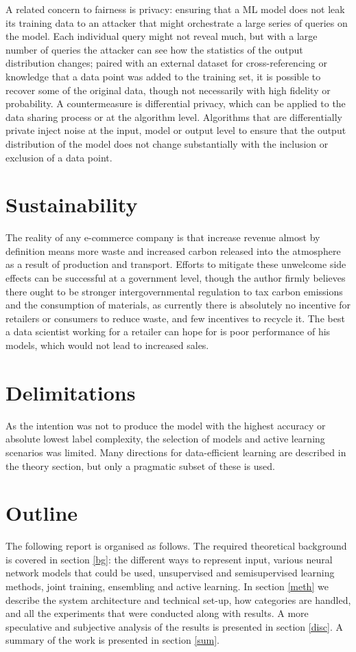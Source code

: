 A related concern to fairness is privacy: ensuring that a ML model does not leak its training data to an attacker that might orchestrate a large series of queries on the model.
Each individual query might not reveal much, but with a large number of queries the attacker can see how the statistics of the output distribution changes; paired with an external dataset for cross-referencing or knowledge that a data point was added to the training set, it is possible to recover some of the original data, though not necessarily with high fidelity or probability.
A countermeasure is differential privacy, which can be applied to the data sharing process or at the algorithm level.
Algorithms that are differentially private inject noise at the input, model or output level to ensure that the output distribution of the model does not change substantially with the inclusion or exclusion of a data point.

\section{Sustainability}

The reality of any e-commerce company is that increase revenue almost by definition means more waste  and increased carbon released into the atmosphere  as a result of production and transport.
Efforts to mitigate these unwelcome side effects can be successful at a government level, though  the author firmly believes there ought to be stronger intergovernmental regulation to tax carbon emissions and the consumption of materials, as currently there is absolutely no incentive for retailers or consumers to reduce waste, and few incentives to recycle it.
The best a data scientist working for a retailer can hope for is poor performance of his models, which would not lead to increased sales.

\section{Delimitations}

As the intention was not to produce the model with the highest accuracy or absolute lowest label complexity, the selection of models and active learning scenarios was limited.
Many directions for data-efficient learning are described in the theory section, but only a pragmatic subset of these is used.

\section{Outline}

The following report is organised as follows.
The required theoretical background is covered in section \ref{bg}: the different ways to represent input, various neural network models that could be used, unsupervised and semisupervised learning methods, joint training, ensembling and active learning.
In section \ref{meth} we describe the system architecture and technical set-up, how categories are handled, and all the experiments that were conducted along with results.
A more speculative and subjective analysis of the results is presented in section \ref{disc}.
A summary of the work is presented in section \ref{sum}.
